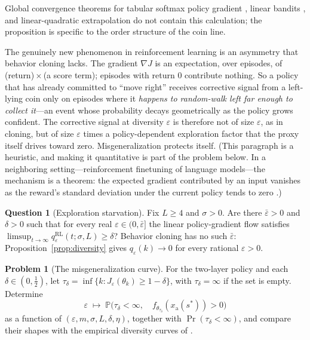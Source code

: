 \documentclass[11pt]{amsart}
\theoremstyle{plain}
\theoremstyle{definition}
\newtheorem{problem}[theorem]{Problem}
\newtheorem{question}[theorem]{Question}
\begin{document}
Global convergence theorems for tabular softmax policy gradient \cite{mei2020,agarwal2021}, linear bandits \cite{lin2025}, and linear-quadratic extrapolation \cite{razin2024} do not contain this calculation; the proposition is specific to the order structure of the coin line.

The genuinely new phenomenon in reinforcement learning is an asymmetry that behavior cloning lacks. The gradient $\nabla J$ is an expectation, over episodes, of (return)\,$\times$\,(a score term); episodes with return $0$ contribute nothing. So a policy that has already committed to ``move right'' receives corrective signal from a left-lying coin only on episodes where it \emph{happens to random-walk left far enough to collect it}---an event whose probability decays geometrically as the policy grows confident. The corrective signal at diversity $\varepsilon$ is therefore not of size $\varepsilon$, as in cloning, but of size $\varepsilon$ times a policy-dependent exploration factor that the proxy itself drives toward zero. Misgeneralization protects itself. (This paragraph is a heuristic, and making it quantitative is part of the problem below. In a neighboring setting---reinforcement finetuning of language models---the mechanism is a theorem: the expected gradient contributed by an input vanishes as the reward's standard deviation under the current policy tends to zero \cite{razin2024vanish}.)

\begin{question}[Exploration starvation]\label{q:starvation}
Fix $L\ge4$ and $\sigma>0$. Are there $\bar\varepsilon>0$ and $\delta>0$ such that for every real $\varepsilon\in(0,\bar\varepsilon]$ the linear policy-gradient flow satisfies $\limsup_{t\to\infty}q^{\mathrm{RL}}_\varepsilon(t;\sigma,L)\ge\delta$? Behavior cloning has no such $\bar\varepsilon$: Proposition~\ref{prop:diversity} gives $q_\varepsilon(k)\to0$ for every rational $\varepsilon>0$.
\end{question}

\begin{problem}[The misgeneralization curve]\label{prob:curve}
For the two-layer policy and each $\delta\in(0,\tfrac12)$, let $\tau_\delta=\inf\{k: J_\varepsilon(\theta_k)\ge1-\delta\}$, with $\tau_\delta=\infty$ if the set is empty. Determine
\[
   \varepsilon\;\longmapsto\;
   \mathbb P\bigl(\tau_\delta<\infty,\quad
   f_{\theta_{\tau_\delta}}(x_{\mathrm a}(s^{*}))>0\bigr)
\]
as a function of $(\varepsilon,m,\sigma,L,\delta,\eta)$, together with $\Pr(\tau_\delta<\infty)$, and compare their shapes with the empirical diversity curves of \cite[\S4.1]{langosco2022}.
\end{problem}
\end{document}
